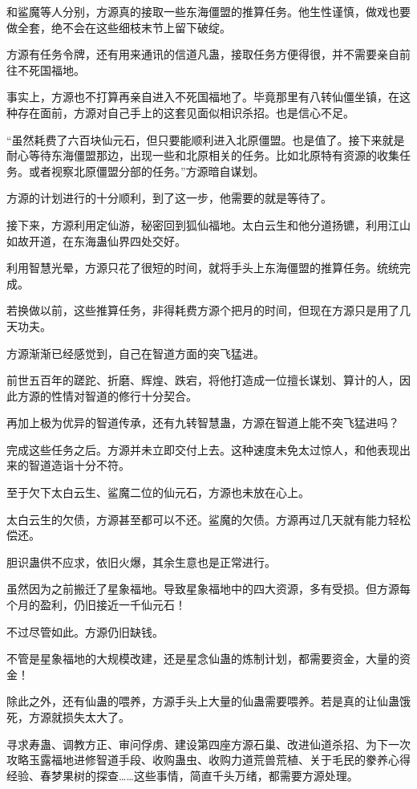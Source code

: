 \begin{this_body}
和鲨魔等人分别，方源真的接取一些东海僵盟的推算任务。他生性谨慎，做戏也要做全套，绝不会在这些细枝末节上留下破绽。

方源有任务令牌，还有用来通讯的信道凡蛊，接取任务方便得很，并不需要亲自前往不死国福地。

事实上，方源也不打算再亲自进入不死国福地了。毕竟那里有八转仙僵坐镇，在这种存在面前，方源对自己手上的这套见面似相识杀招。也是信心不足。

“虽然耗费了六百块仙元石，但只要能顺利进入北原僵盟。也是值了。接下来就是耐心等待东海僵盟那边，出现一些和北原相关的任务。比如北原特有资源的收集任务。或者视察北原僵盟分部的任务。”方源暗自谋划。

方源的计划进行的十分顺利，到了这一步，他需要的就是等待了。

接下来，方源利用定仙游，秘密回到狐仙福地。太白云生和他分道扬镳，利用江山如故开道，在东海蛊仙界四处交好。

利用智慧光晕，方源只花了很短的时间，就将手头上东海僵盟的推算任务。统统完成。

若换做以前，这些推算任务，非得耗费方源个把月的时间，但现在方源只是用了几天功夫。

方源渐渐已经感觉到，自己在智道方面的突飞猛进。

前世五百年的蹉跎、折磨、辉煌、跌宕，将他打造成一位擅长谋划、算计的人，因此方源的性情对智道的修行十分契合。

再加上极为优异的智道传承，还有九转智慧蛊，方源在智道上能不突飞猛进吗？

完成这些任务之后。方源并未立即交付上去。这种速度未免太过惊人，和他表现出来的智道造诣十分不符。

至于欠下太白云生、鲨魔二位的仙元石，方源也未放在心上。

太白云生的欠债，方源甚至都可以不还。鲨魔的欠债。方源再过几天就有能力轻松偿还。

胆识蛊供不应求，依旧火爆，其余生意也是正常进行。

虽然因为之前搬迁了星象福地。导致星象福地中的四大资源，多有受损。但方源每个月的盈利，仍旧接近一千仙元石！

不过尽管如此。方源仍旧缺钱。

不管是星象福地的大规模改建，还是星念仙蛊的炼制计划，都需要资金，大量的资金！

除此之外，还有仙蛊的喂养，方源手头上大量的仙蛊需要喂养。若是真的让仙蛊饿死，方源就损失太大了。

寻求寿蛊、调教方正、审问俘虏、建设第四座方源石巢、改进仙道杀招、为下一次攻略玉露福地进修智道手段、收购蛊虫、收购力道荒兽荒植、关于毛民的豢养心得经验、春梦果树的探查……这些事情，简直千头万绪，都需要方源处理。


\end{this_body}
